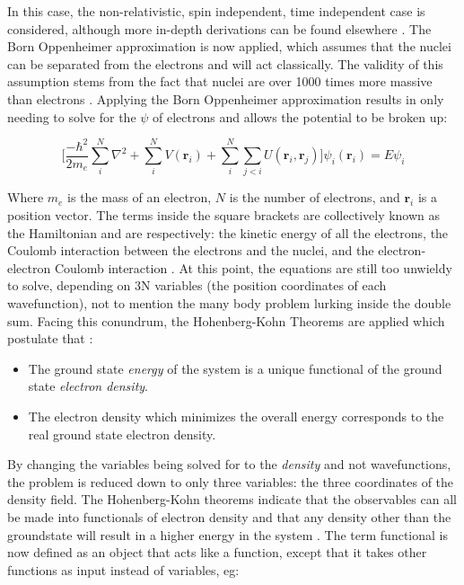 In this case, the non-relativistic, spin independent, time independent case is considered, although more in-depth derivations can be found elsewhere \cite{tddft}. The Born Oppenheimer approximation is now applied, which assumes that the nuclei can be separated from the electrons and will act classically. The validity of this assumption stems from the fact that nuclei are over 1000 times more massive than electrons \cite{graff_direct_1980}.  Applying the Born Oppenheimer approximation results in only needing to solve for the $\psi$ of electrons and allows the potential to be broken up:

\begin{equation}
	\bigg[\frac{-\hbar^2}{2m_e}\sum_{i}^{N} \nabla^2 +\sum_{i}^{N} V(\textbf{r}_i) + \sum_{i}^{N}\sum_{j <i}U(\textbf{r}_i,\textbf{r}_j) \bigg] \psi_i(\textbf{r}_i) = E \psi_i
\end{equation}

Where $m_e$ is the mass of an electron, $N$ is the number of electrons, and $\textbf{r}_i$ is a position vector. The terms inside the square brackets are collectively known as the Hamiltonian and are respectively: the kinetic energy of all the electrons, the Coulomb interaction between the electrons and the nuclei, and the electron-electron Coulomb interaction  \cite{sholl_density_2009}. At this point, the equations are still too unwieldy to solve, depending on 3N variables (the position coordinates of each wavefunction), not to mention the many body problem lurking inside the double sum.  Facing this conundrum, the Hohenberg-Kohn Theorems are applied which postulate that \cite{hohenberg_inhomogeneous_1964}:
\begin{itemize}
	\item  The ground state \textit{energy} of the system is a unique functional of the ground state \textit{electron density}.
	\item The electron density which minimizes the overall energy corresponds to the real ground state electron density.  
\end{itemize}

By changing the variables being solved for to the \textit{density} and not wavefunctions, the problem is reduced down to only three variables: the three coordinates of the density field.  The Hohenberg-Kohn theorems indicate that the observables can all be made into functionals of electron density and that any density other than the groundstate will result in a higher energy in the system \cite{parr_density_1983}.  The term functional is now defined as an object that acts like a function, except that it takes other functions as input instead of variables, eg:

